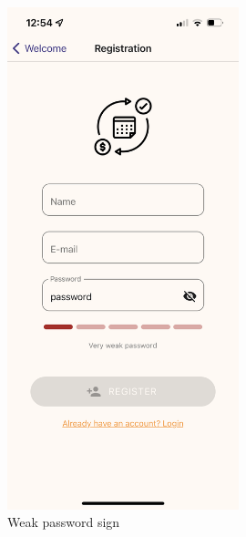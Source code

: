 \documentclass[12pt]{article}
\begin{document}
\begin{figure}[h!]
    \centering
    \begin{minipage}[c]{0.45\textwidth}
        \centering
        \includegraphics[width=0.6\textwidth, clip]{../../assets/smartphone/weak.PNG}
        \caption{Weak password sign}
        \label{fig:weak}
    \end{minipage}\hspace{1cm}%
    \begin{minipage}[c]{0.45\textwidth}
        \centering

\end{minipage}
\end{figure}
\end{document}
